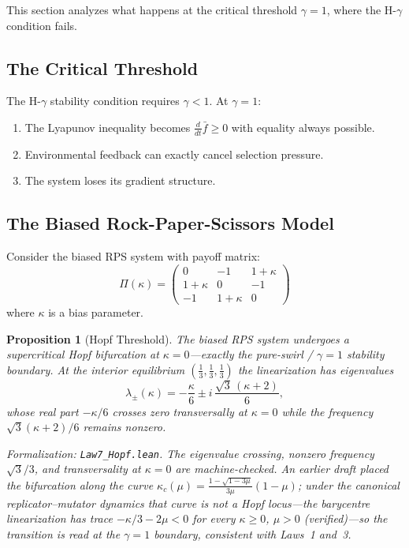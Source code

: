 \documentclass[12pt]{article}
\newtheorem{proposition}[theorem]{Proposition}
\begin{document}
This section analyzes what happens at the critical threshold $\gamma = 1$, where the H-$\gamma$ condition fails.

\subsection{The Critical Threshold}

The H-$\gamma$ stability condition requires $\gamma < 1$. At $\gamma = 1$:
\begin{enumerate}
    \item The Lyapunov inequality becomes $\frac{d}{dt}\bar{f} \geq 0$ with equality always possible.
    \item Environmental feedback can exactly cancel selection pressure.
    \item The system loses its gradient structure.
\end{enumerate}

\subsection{The Biased Rock-Paper-Scissors Model}

Consider the biased RPS system with payoff matrix:
\[
\Pi(\kappa) = \begin{pmatrix} 0 & -1 & 1+\kappa \\ 1+\kappa & 0 & -1 \\ -1 & 1+\kappa & 0 \end{pmatrix}
\]
where $\kappa$ is a bias parameter.

\begin{proposition}[Hopf Threshold]
\label{prop:hopf-threshold}
The biased RPS system undergoes a supercritical Hopf bifurcation at $\kappa = 0$---exactly the pure-swirl / $\gamma = 1$ stability boundary. At the interior equilibrium $(\tfrac13, \tfrac13, \tfrac13)$ the linearization has eigenvalues
\[
\lambda_\pm(\kappa) = -\frac{\kappa}{6} \pm i\,\frac{\sqrt{3}\,(\kappa + 2)}{6},
\]
whose real part $-\kappa/6$ crosses zero transversally at $\kappa = 0$ while the frequency $\sqrt{3}(\kappa+2)/6$ remains nonzero.
\end{proposition}
\noindent\textit{Formalization: \texttt{Law7\_Hopf.lean}. The eigenvalue crossing, nonzero frequency $\sqrt{3}/3$, and transversality at $\kappa = 0$ are machine-checked. An earlier draft placed the bifurcation along the curve $\kappa_c(\mu) = \frac{1 - \sqrt{1 - 3\mu}}{3\mu}(1 - \mu)$; under the canonical replicator--mutator dynamics that curve is \emph{not} a Hopf locus---the barycentre linearization has trace $-\kappa/3 - 2\mu < 0$ for every $\kappa \geq 0$, $\mu > 0$ (verified)---so the transition is read at the $\gamma = 1$ boundary, consistent with Laws~1 and~3.}
\end{document}
